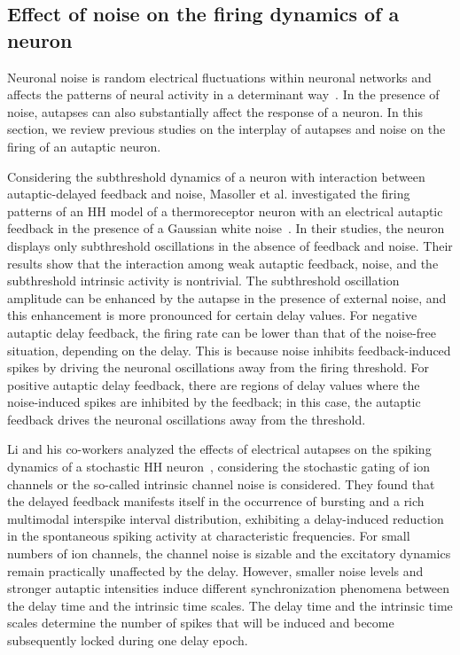 \documentclass[twocolumn,showpacs,preprintnumbers,amsmath,amssymb,pre,superscriptaddress]{revtex4-1}
\begin{document}
\begin{CJK}{UTF8}{gbsn}
\section{Effect of noise on the firing dynamics of a neuron}
%

Neuronal noise is random electrical fluctuations within neuronal networks and affects the patterns of neural activity in a determinant way~\cite{white,Jacobson,wanghuiqiao,Destexhe}. In the presence of noise, autapses can also substantially affect the response of a neuron. In this section, we review previous studies on the interplay of autapses and noise on the firing of an autaptic neuron.

Considering the subthreshold dynamics of a neuron with interaction between autaptic-delayed feedback and noise, Masoller et al. investigated the firing patterns of an HH model of a thermoreceptor neuron with an electrical autaptic feedback in the presence of a Gaussian white noise~\cite{masoller}. In their studies, the neuron displays only subthreshold oscillations in the absence of feedback and noise. Their results show that the interaction among weak autaptic feedback, noise, and the subthreshold intrinsic activity is nontrivial. The subthreshold oscillation amplitude can be enhanced by the autapse in the presence of external noise, and this enhancement is more pronounced for certain delay values. For negative autaptic delay feedback, the firing rate can be lower than that of the noise-free situation, depending on the delay. This is because noise inhibits feedback-induced spikes by driving the neuronal oscillations away from the firing threshold. For positive autaptic delay feedback, there are regions of delay values where the noise-induced spikes are inhibited by the feedback; in this case, the autaptic feedback drives the neuronal oscillations away from the threshold.  

Li and his co-workers analyzed the effects of electrical autapses on the spiking dynamics of a stochastic HH neuron~\cite{liyy}, considering the stochastic gating of ion channels or the so-called intrinsic channel noise is considered. They found that the delayed feedback manifests itself in the occurrence of bursting and a rich multimodal interspike interval distribution, exhibiting a delay-induced reduction in the spontaneous spiking activity at characteristic frequencies. For small numbers of ion channels, the channel noise is sizable and the excitatory dynamics remain practically unaffected by the delay. However, smaller noise levels and stronger autaptic intensities induce different synchronization phenomena between the delay time and the intrinsic time scales. The delay time and the intrinsic time scales determine the number of spikes that will be induced and become subsequently locked during one delay epoch. 


\end{CJK}
\end{document}
